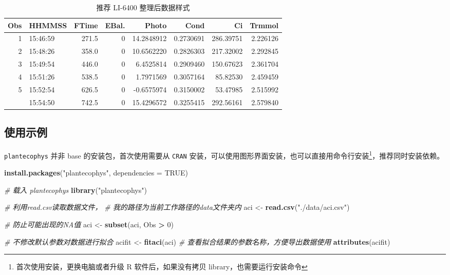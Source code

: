 \documentclass[
]{krantz}
\makeatletter
\newenvironment{Shaded}{\begin{snugshade}}{\end{snugshade}}
\newcommand{\CommentTok}[1]{\textcolor[rgb]{0.56,0.35,0.01}{\textit{#1}}}
\newcommand{\DataTypeTok}[1]{\textcolor[rgb]{0.13,0.29,0.53}{#1}}
\newcommand{\DecValTok}[1]{\textcolor[rgb]{0.00,0.00,0.81}{#1}}
\newcommand{\KeywordTok}[1]{\textcolor[rgb]{0.13,0.29,0.53}{\textbf{#1}}}
\newcommand{\NormalTok}[1]{#1}
\newcommand{\OperatorTok}[1]{\textcolor[rgb]{0.81,0.36,0.00}{\textbf{#1}}}
\newcommand{\OtherTok}[1]{\textcolor[rgb]{0.56,0.35,0.01}{#1}}
\newcommand{\StringTok}[1]{\textcolor[rgb]{0.31,0.60,0.02}{#1}}
\newenvironment{kframe}{%
\medskip{}
\setlength{\fboxsep}{.8em}
 \def\at@end@of@kframe{}%
 \ifinner\ifhmode%
  \def\at@end@of@kframe{\end{minipage}}%
  \begin{minipage}{\columnwidth}%
 \fi\fi%
 \def\FrameCommand##1{\hskip\@totalleftmargin \hskip-\fboxsep
 \colorbox{shadecolor}{##1}\hskip-\fboxsep
     \hskip-\linewidth \hskip-\@totalleftmargin \hskip\columnwidth}%
 \MakeFramed {\advance\hsize-\width
   \@totalleftmargin\z@ \linewidth\hsize
   \@setminipage}}%
 {\par\unskip\endMakeFramed%
 \at@end@of@kframe}
\renewenvironment{Shaded}{\begin{kframe}}{\end{kframe}}
\makeatother
\begin{document}
\begin{longtable}[t]{rlrrrrrr}
\caption{\label{tab:head6400}推荐 LI-6400 整理后数据样式}\\
\toprule
Obs & HHMMSS & FTime & EBal. & Photo & Cond & Ci & Trmmol\\
\midrule
1 & 15:46:59 & 271.5 & 0 & 14.2848912 & 0.2730691 & 286.39751 & 2.226126\\
2 & 15:48:26 & 358.0 & 0 & 10.6562220 & 0.2826303 & 217.32002 & 2.292845\\
3 & 15:49:54 & 446.0 & 0 & 6.4525814 & 0.2909460 & 150.67623 & 2.361704\\
4 & 15:51:26 & 538.5 & 0 & 1.7971569 & 0.3057164 & 85.82530 & 2.459459\\
5 & 15:52:54 & 626.5 & 0 & -0.6575974 & 0.3150002 & 53.47985 & 2.515992\\
\addlinespace
6 & 15:54:50 & 742.5 & 0 & 15.4296572 & 0.3255415 & 292.56161 & 2.579840\\
\bottomrule
\end{longtable}

\hypertarget{fitaci-p}{%
\subsection{使用示例}\label{fitaci-p}}

\texttt{plantecophys} 并非 base 的安装包，首次使用需要从 \texttt{CRAN} 安装，可以使用图形界面安装，也可以直接用命令行安装\footnote{首次使用安装，更换电脑或者升级 R 软件后，如果没有拷贝 library，也需要运行安装命令}，推荐同时安装依赖。

\begin{Shaded}
\begin{Highlighting}[]
\KeywordTok{install.packages}\NormalTok{(}\StringTok{"plantecophys"}\NormalTok{, }\DataTypeTok{dependencies =} \OtherTok{TRUE}\NormalTok{)}
\end{Highlighting}
\end{Shaded}

\begin{Shaded}
\begin{Highlighting}[]
\CommentTok{\# 载入 plantecophys }
\KeywordTok{library}\NormalTok{(}\StringTok{"plantecophys"}\NormalTok{)}

\CommentTok{\# 利用read.csv读取数据文件，}
\CommentTok{\# 我的路径为当前工作路径的data文件夹内}
\NormalTok{aci \textless{}{-}}\StringTok{ }\KeywordTok{read.csv}\NormalTok{(}\StringTok{"./data/aci.csv"}\NormalTok{)}

\CommentTok{\# 防止可能出现的NA值}
\NormalTok{aci \textless{}{-}}\StringTok{ }\KeywordTok{subset}\NormalTok{(aci, Obs }\OperatorTok{\textgreater{}}\StringTok{ }\DecValTok{0}\NormalTok{)}

\CommentTok{\# 不修改默认参数对数据进行拟合}
\NormalTok{acifit \textless{}{-}}\StringTok{ }\KeywordTok{fitaci}\NormalTok{(aci)}
\CommentTok{\# 查看拟合结果的参数名称，方便导出数据使用}
\KeywordTok{attributes}\NormalTok{(acifit)}
\end{Highlighting}
\end{Shaded}
\end{document}
